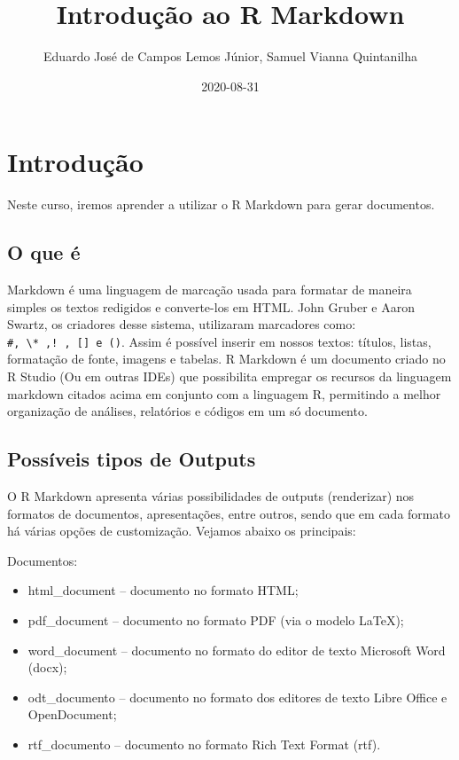 \documentclass[
]{book}
\title{Introdução ao R Markdown}
\author{Eduardo José de Campos Lemos Júnior, Samuel Vianna Quintanilha}
\date{2020-08-31}
\providecommand{\tightlist}{%
  \setlength{\itemsep}{0pt}\setlength{\parskip}{0pt}}
\begin{document}
\maketitle

{
\setcounter{tocdepth}{1}
\tableofcontents
}
\hypertarget{intro}{%
\chapter{Introdução}\label{intro}}

Neste curso, iremos aprender a utilizar o R Markdown para gerar documentos.

\hypertarget{o-que-uxe9}{%
\section{O que é}\label{o-que-uxe9}}

Markdown é uma linguagem de marcação usada para formatar de maneira simples os textos redigidos e converte-los em HTML. John Gruber e Aaron Swartz, os criadores desse sistema, utilizaram marcadores como: \texttt{\#,\ \textbackslash{}*\ ,!\ ,\ {[}{]}\ e\ ()}. Assim é possível inserir em nossos textos: títulos, listas, formatação de fonte, imagens e tabelas.
R Markdown é um documento criado no R Studio (Ou em outras IDEs) que possibilita empregar os recursos da linguagem markdown citados acima em conjunto com a linguagem R, permitindo a melhor organização de análises, relatórios e códigos em um só documento.

\hypertarget{possuxedveis-tipos-de-outputs}{%
\section{Possíveis tipos de Outputs}\label{possuxedveis-tipos-de-outputs}}

O R Markdown apresenta várias possibilidades de outputs (renderizar) nos formatos de documentos, apresentações, entre outros, sendo que em cada formato há várias opções de customização. Vejamos abaixo os principais:

Documentos:

\begin{itemize}
\tightlist
\item
  html\_document -- documento no formato HTML;
\item
  pdf\_document -- documento no formato PDF (via o modelo LaTeX);
\item
  word\_document -- documento no formato do editor de texto Microsoft Word (docx);
\item
  odt\_documento -- documento no formato dos editores de texto Libre Office e OpenDocument;
\item
  rtf\_documento -- documento no formato Rich Text Format (rtf).
\end{itemize}
\end{document}
